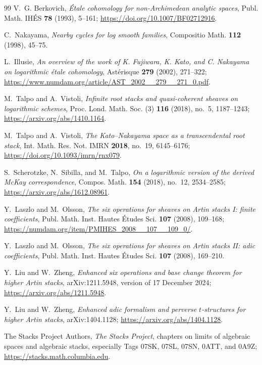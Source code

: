 \documentclass[11pt]{article}
\theoremstyle{definition}
\theoremstyle{remark}
\begin{document}
\begin{thebibliography}{99}
V.~G. Berkovich,
\emph{\'{E}tale cohomology for non-Archimedean analytic spaces},
Publ. Math. IH\'{E}S \textbf{78} (1993), 5--161;
\url{https://doi.org/10.1007/BF02712916}.

C.~Nakayama,
\emph{Nearby cycles for log smooth families},
Compositio Math. \textbf{112} (1998), 45--75.

L.~Illusie,
\emph{An overview of the work of K. Fujiwara, K. Kato, and C. Nakayama on
logarithmic \'{e}tale cohomology},
Ast\'{e}risque \textbf{279} (2002), 271--322;
\url{https://www.numdam.org/article/AST_2002__279__271_0.pdf}.

M.~Talpo and A.~Vistoli,
\emph{Infinite root stacks and quasi-coherent sheaves on logarithmic
schemes},
Proc. Lond. Math. Soc. (3) \textbf{116} (2018), no.~5, 1187--1243;
\url{https://arxiv.org/abs/1410.1164}.

M.~Talpo and A.~Vistoli,
\emph{The Kato--Nakayama space as a transcendental root stack},
Int. Math. Res. Not. IMRN \textbf{2018}, no.~19, 6145--6176;
\url{https://doi.org/10.1093/imrn/rnx079}.

S.~Scherotzke, N.~Sibilla, and M.~Talpo,
\emph{On a logarithmic version of the derived McKay correspondence},
Compos. Math. \textbf{154} (2018), no.~12, 2534--2585;
\url{https://arxiv.org/abs/1612.08961}.

Y.~Laszlo and M.~Olsson,
\emph{The six operations for sheaves on Artin stacks I: finite coefficients},
Publ. Math. Inst. Hautes \'{E}tudes Sci. \textbf{107} (2008), 109--168;
\url{https://numdam.org/item/PMIHES_2008__107__109_0/}.

Y.~Laszlo and M.~Olsson,
\emph{The six operations for sheaves on Artin stacks II: adic coefficients},
Publ. Math. Inst. Hautes \'{E}tudes Sci. \textbf{107} (2008), 169--210.

Y.~Liu and W.~Zheng,
\emph{Enhanced six operations and base change theorem for higher Artin
stacks}, arXiv:1211.5948, version of 17 December 2024;
\url{https://arxiv.org/abs/1211.5948}.

Y.~Liu and W.~Zheng,
\emph{Enhanced adic formalism and perverse $t$-structures for higher Artin
stacks}, arXiv:1404.1128;
\url{https://arxiv.org/abs/1404.1128}.

The Stacks Project Authors,
\emph{The Stacks Project},
chapters on limits of algebraic spaces and algebraic stacks, especially
Tags 07SK, 07SL, 07SN, 0ATT, and 0A9Z;
\url{https://stacks.math.columbia.edu}.


\end{thebibliography}
\end{document}

